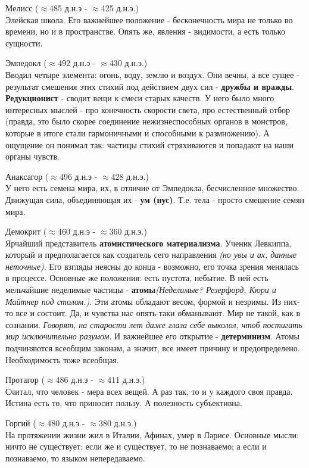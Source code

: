 \documentclass[12pt,a4paper]{article}
\begin{document}
Мелисс ($\approx$485 д.н.э - $\approx$425 д.н.э.)\\
Элейская школа. Его важнейшее положение - бесконечность мира не только во времени, но и в пространстве. Опять же, явления - видимости, а есть только сущности.

Эмпедокл ($\approx$492 д.н.э - $\approx$430 д.н.э.)\\
Вводил четыре элемента: огонь, воду, землю и воздух. Они вечны, а все сущее - результат смешения этих стихий под действием двух сил - \textbf{дружбы и вражды}. \textbf{Редукционист} - сводит вещи к смеси старых качеств. У него было много интересных мыслей - про конечность скорости света, про естественный отбор (правда, это было скорее соединение нежизнеспособных органов в монстров, которые в итоге стали гармоничными и способными к размножению). А ощущение он понимал так: частицы стихий стряхиваются и попадают на наши органы чувств.

Анаксагор ($\approx$496 д.н.э - $\approx$428 д.н.э.)\\
У него есть семена мира, их, в отличие от Эмпедокла, бесчисленное множество. Движущая сила, объединяющая их - \textbf{ум (нус)}. Т.е. тела - просто смешение семян мира.

Демокрит ($\approx$460 д.н.э - $\approx$360 д.н.э.)\\
Ярчайший представитель \textbf{атомистического материализма}. Ученик Левкиппа, который и предполагается как создатель сего направления \textit{(но увы и ах, данные неточные)}.
Его взгляды неясны до конца - возможно, его точка зрения менялась в процессе. Основные же положения: есть пустота, небытие. В ней есть мельчайшие неделимые частицы - \textbf{атомы}\textit{(Неделимые? Резерфорд, Кюри и Майтнер под столом.)}. Эти атомы обладают весом, формой и незримы. Из них-то все и состоит. Да, и чувства нас опять-таки обманывают. Мир не такой, как в сознании. \textit{Говорят, на старости лет даже глаза себе выколол, чтоб постигать мир исключительно разумом}. И важнейшее его открытие - \textbf{детерминизм}. Атомы подчиняются всеобщим законам, а значит, все имеет причину и предопределено. Необходимость тоже всеобщая. 

Протагор ($\approx$486 д.н.э - $\approx$411 д.н.э.)\\
Считал, что человек - мера всех вещей. А раз так, то и у каждого своя правда. Истина есть то, что приносит пользу. А полезность субъективна.

Горгий ($\approx$480 д.н.э - $\approx$380 д.н.э.)\\
На протяжении жизни жил в Италии, Афинах, умер в Ларисе. Основные мысли: ничто не существует; если же и существует, то не познаваемо; а если и познаваемо, то языком непередаваемо.
\end{document}

